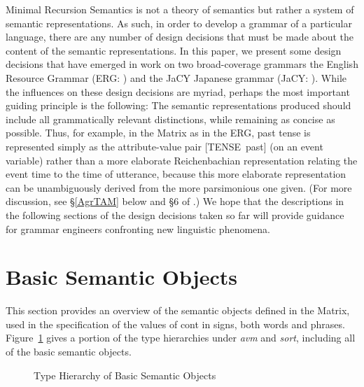 \documentclass[12pt]{article}
\begin{document}
Minimal Recursion Semantics is not a theory of semantics but rather a
system of semantic representations.  As such, in order to develop a
grammar of a particular language, there are any number of design
decisions that must be made about the content of the semantic
representations.  In this paper, we present some design decisions that
have emerged in work on two broad-coverage grammars the English
Resource Grammar (ERG: ) and the JaCY Japanese
grammar (JaCY: ). 
While the influences on these design decisions
are myriad, perhaps the most important guiding principle is the
following: The semantic representations produced should include all
grammatically relevant distinctions, while remaining as concise as
possible.  Thus, for example, in the Matrix as in the ERG, past tense
is represented simply as the attribute-value pair \mbox{[TENSE past]}
(on an event variable) rather than a more elaborate Reichenbachian
representation relating the event time to the time of utterance,
because this more elaborate representation can be unambiguously
derived from the more parsimonious one given.  (For more discussion,
see \S\ref{AgrTAM} below and {\S}6 of .)
We hope that the descriptions in the following sections of the design
decisions taken so far will provide guidance for grammar engineers
confronting new linguistic phenomena.

\section{Basic Semantic Objects}
\label{basicobj}

This section provides an overview of the semantic objects defined in the
Matrix, used in the specification of the values of {\sc cont} in signs, both
words and phrases.  Figure~\ref{mrsobj} gives a portion of the type hierarchies
under {\it avm} and {\it sort}, including all of the basic semantic objects.

\begin{figure}[ht]
\begin{center}
{\it\small
\begin{tree}
\end{tree}
}
\end{center}
\caption{Type Hierarchy of Basic Semantic Objects}
\label{mrsobj}
\end{figure}
\end{document}

